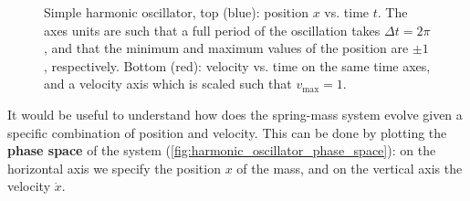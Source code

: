 \begin{figure}
  \centering
  \caption{Simple harmonic oscillator, top (blue): position $x$ vs. time $t$. The axes units are such that a full period of the oscillation takes $\Delta t=2\pi$, and that the minimum and maximum values of the position are $\pm1$, respectively. Bottom (red): velocity vs. time on the same time axes, and a velocity axis which is scaled such that $v_{\max}=1$.}
  \label{fig:simple_spring_plot}
\end{figure}

It would be useful to understand how does the spring-mass system evolve given a specific combination of position and velocity. This can be done by plotting the \textbf{phase space} of the system (\autoref{fig:harmonic_oscillator_phase_space}): on the horizontal axis we specify the position $x$ of the mass, and on the vertical axis the velocity $\dot{x}$.

